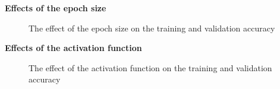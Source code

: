 \documentclass[a4paper]{article}
\begin{document}
\textbf{Effects of the epoch size}


\begin{figure} [htbp]
    \caption{The effect of the epoch size on the training and validation accuracy} 
    \label{fig:mnist_ann_result_epoch}
\end{figure}

\textbf{Effects of the activation function}


\begin{figure} [htbp]
    \caption{The effect of the activation function on the training and validation accuracy} 
    \label{fig:mnist_ann_result_activation}
\end{figure}

\newpage
\end{document}
